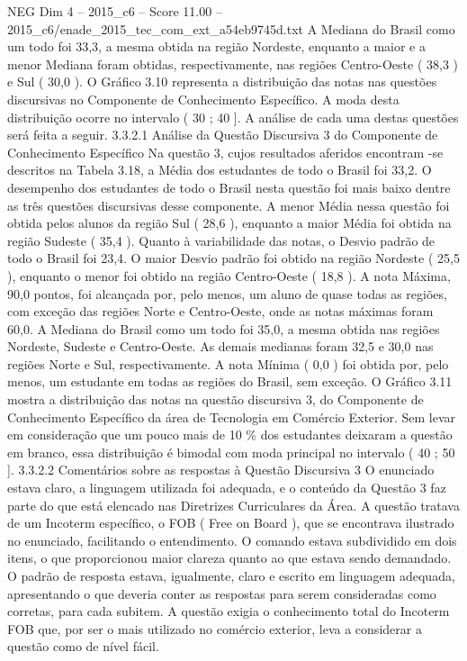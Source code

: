 \begin{textsample}{NEG Dim 4 – 2015\_c6 – Score 11.00 – 2015\_c6/enade\_2015\_tec\_com\_ext\_a54eb9745d.txt}
A Mediana do Brasil como um todo foi 33,3, a mesma obtida na região Nordeste, enquanto a maior e a menor Mediana foram obtidas, respectivamente, nas regiões Centro-Oeste ( 38,3 ) e Sul ( 30,0 ).
O Gráfico 3.10 representa a distribuição das notas nas questões discursivas no Componente de Conhecimento Específico.
A moda desta distribuição ocorre no intervalo ( 30 ; 40 ].
A análise de cada uma destas questões será feita a seguir. 3.3.2.1 Análise da Questão Discursiva 3 do Componente de Conhecimento Específico Na questão 3, cujos resultados aferidos encontram -se descritos na Tabela 3.18, a Média dos estudantes de todo o Brasil foi 33,2.
O desempenho dos estudantes de todo o Brasil nesta questão foi mais baixo dentre as três questões discursivas desse componente.
A menor Média nessa questão foi obtida pelos alunos da região Sul ( 28,6 ), enquanto a maior Média foi obtida na região Sudeste ( 35,4 ).
Quanto à variabilidade das notas, o Desvio padrão de todo o Brasil foi 23,4.
O maior Desvio padrão foi obtido na região Nordeste ( 25,5 ), enquanto o menor foi obtido na região Centro-Oeste ( 18,8 ).
A nota Máxima, 90,0 pontos, foi alcançada por, pelo menos, um aluno de quase todas as regiões, com exceção das regiões Norte e Centro-Oeste, onde as notas máximas foram 60,0.
A Mediana do Brasil como um todo foi 35,0, a mesma obtida nas regiões Nordeste, Sudeste e Centro-Oeste.
As demais medianas foram 32,5 e 30,0 nas regiões Norte e Sul, respectivamente.
A nota Mínima ( 0,0 ) foi obtida por, pelo menos, um estudante em todas as regiões do Brasil, sem exceção.
O Gráfico 3.11 mostra a distribuição das notas na questão discursiva 3, do Componente de Conhecimento Específico da área de Tecnologia em Comércio Exterior.
Sem levar em consideração que um pouco mais de 10 \% dos estudantes deixaram a questão em branco, essa distribuição é bimodal com moda principal no intervalo ( 40 ; 50 ]. 3.3.2.2 Comentários sobre as respostas à Questão Discursiva 3 O enunciado estava claro, a linguagem utilizada foi adequada, e o conteúdo da Questão 3 faz parte do que está elencado nas Diretrizes Curriculares da Área.
A questão tratava de um Incoterm específico, o FOB ( Free on Board ), que se encontrava ilustrado no enunciado, facilitando o entendimento.
O comando estava subdividido em dois itens, o que proporcionou maior clareza quanto ao que estava sendo demandado.
O padrão de resposta estava, igualmente, claro e escrito em linguagem adequada, apresentando o que deveria conter as respostas para serem consideradas como corretas, para cada subitem.
A questão exigia o conhecimento total do Incoterm FOB que, por ser o mais utilizado no comércio exterior, leva a considerar a questão como de nível fácil.

\end{textsample}
